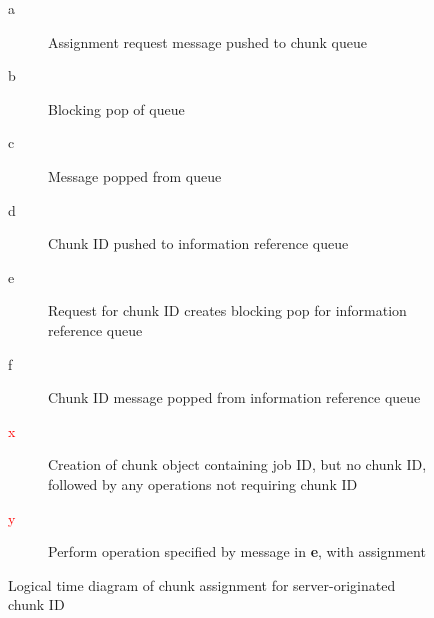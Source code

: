 \documentclass[a4paper,10pt]{article}
\begin{document}
\begin{figure}
	\begin{minipage}{0.4\textwidth}
	\end{minipage}
	\begin{minipage}{0.6\textwidth}
		\begin{description}
			\item [a] Assignment request message pushed to chunk
				queue
			\item [b] Blocking pop of queue
			\item [c] Message popped from queue
			\item [d] Chunk ID pushed to information reference
				queue
			\item [e] Request for chunk ID creates blocking pop for
				information reference queue
			\item [f] Chunk ID message popped from information
				reference queue
			\item [\textcolor{red}{x}] Creation of chunk object
				containing job ID, but no chunk ID, followed by
				any operations not requiring chunk ID
			\item [\textcolor{red}{y}] Perform operation specified
				by message in \textbf{e}, with assignment
		\end{description}
	\end{minipage}
	\caption{\label{fig:w-o-td}Logical time diagram of chunk assignment for
	server-originated chunk ID}
\end{figure}

\printbibliography
\end{document}
